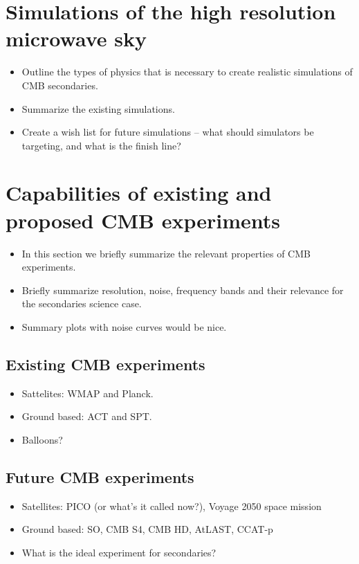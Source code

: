 \documentclass[aps,nofootinbib,groupedaddress]{revtex4}
\begin{document}
\section{Simulations of the high resolution microwave sky}

\begin{itemize}
\item Outline the types of physics that is necessary to create realistic simulations of CMB secondaries.
\item Summarize the existing simulations.
\item Create a wish list for future simulations -- what should simulators be targeting, and what is the finish line?
\end{itemize}

\section{Capabilities of existing and proposed CMB experiments}

\begin{itemize}
\item In this section we briefly summarize the relevant properties of CMB experiments. 
\item Briefly summarize resolution, noise, frequency bands and their relevance for the secondaries science case.
\item Summary plots with noise curves would be nice.
\end{itemize}

\subsection{Existing CMB experiments}

\begin{itemize}
\item Sattelites: WMAP and Planck.
\item Ground based: ACT and SPT.
\item Balloons?
\end{itemize}

\subsection{Future CMB experiments}

\begin{itemize}
\item Satellites: PICO (or what's it called now?), Voyage 2050 space mission
\item Ground based: SO, CMB S4, CMB HD, AtLAST, CCAT-p 
\item What is the ideal experiment for secondaries?
\end{itemize}
\end{document}
